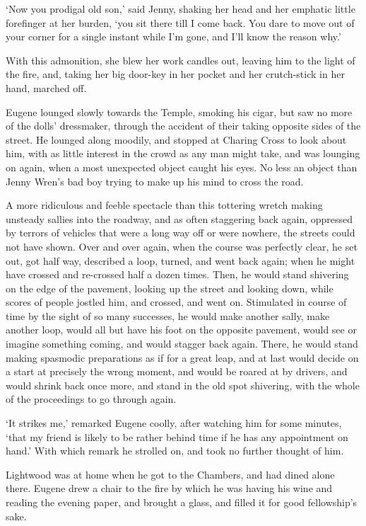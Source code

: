 ‘Now you prodigal old son,’ said Jenny, shaking her head and her
emphatic little forefinger at her burden, ‘you sit there till I come
back. You dare to move out of your corner for a single instant while I’m
gone, and I’ll know the reason why.’

With this admonition, she blew her work candles out, leaving him to the
light of the fire, and, taking her big door-key in her pocket and her
crutch-stick in her hand, marched off.

Eugene lounged slowly towards the Temple, smoking his cigar, but saw
no more of the dolls’ dressmaker, through the accident of their taking
opposite sides of the street. He lounged along moodily, and stopped at
Charing Cross to look about him, with as little interest in the crowd
as any man might take, and was lounging on again, when a most unexpected
object caught his eyes. No less an object than Jenny Wren’s bad boy
trying to make up his mind to cross the road.

A more ridiculous and feeble spectacle than this tottering wretch making
unsteady sallies into the roadway, and as often staggering back again,
oppressed by terrors of vehicles that were a long way off or were
nowhere, the streets could not have shown. Over and over again, when the
course was perfectly clear, he set out, got half way, described a loop,
turned, and went back again; when he might have crossed and re-crossed
half a dozen times. Then, he would stand shivering on the edge of the
pavement, looking up the street and looking down, while scores of people
jostled him, and crossed, and went on. Stimulated in course of time
by the sight of so many successes, he would make another sally, make
another loop, would all but have his foot on the opposite pavement,
would see or imagine something coming, and would stagger back again.
There, he would stand making spasmodic preparations as if for a great
leap, and at last would decide on a start at precisely the wrong moment,
and would be roared at by drivers, and would shrink back once more, and
stand in the old spot shivering, with the whole of the proceedings to go
through again.

‘It strikes me,’ remarked Eugene coolly, after watching him for some
minutes, ‘that my friend is likely to be rather behind time if he has
any appointment on hand.’ With which remark he strolled on, and took no
further thought of him.

Lightwood was at home when he got to the Chambers, and had dined alone
there. Eugene drew a chair to the fire by which he was having his wine
and reading the evening paper, and brought a glass, and filled it for
good fellowship’s sake.


